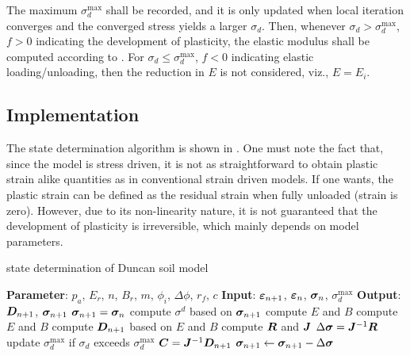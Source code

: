 The maximum $\sigma_d^\text{max}$ shall be recorded, and it is only updated when local iteration converges and the converged stress yields a larger $\sigma_d$.
Then, whenever $\sigma_d>\sigma_d^\text{max}$, $f>0$ indicating the development of plasticity, the elastic modulus shall be computed according to .
For $\sigma_d\leqslant\sigma_d^\text{max}$, $f<0$ indicating elastic loading/unloading, then the reduction in $E$ is not considered, viz., $E=E_i$.
\subsection{Implementation}
The state determination algorithm is shown in .
One must note the fact that, since the model is stress driven, it is not as straightforward to obtain plastic strain alike quantities as in conventional strain driven models.
If one wants, the plastic strain can be defined as the residual strain when fully unloaded (strain is zero).
However, due to its non-linearity nature, it is not guaranteed that the development of plasticity is irreversible, which mainly depends on model parameters.
\begin{breakablealgorithm}
\caption{state determination of Duncan soil model}\label{algo:duncan_model}
\begin{algorithmic}
\State \textbf{Parameter}: $p_a$, $E_r$, $n$, $B_r$, $m$, $\phi_i$, $\Delta\phi$, $r_f$, $c$
\State \textbf{Input}: $\bm{\varepsilon}_{n+1}$, $\bm{\varepsilon}_n$, $\bm{\sigma}_n$, $\sigma_d^{\text{max}}$
\State \textbf{Output}: $\bm{D}_{n+1}$, $\bm{\sigma}_{n+1}$
\State $\bm{\sigma}_{n+1}=\bm{\sigma}_n$
\State compute $\sigma^d$ based on $\bm{\sigma}_{n+1}$
\State compute $E$ and $B$
\Else
\State compute $E$ and $B$
\EndIf
\State compute $\bm{D}_{n+1}$ based on $E$ and $B$
\State compute $\bm{R}$ and $\bm{J}$
\State $\Delta\bm{\sigma}=\bm{J}^{-1}\bm{R}$
\State update $\sigma_d^{\text{max}}$ if $\sigma_d$ exceeds $\sigma_d^{\text{max}}$
\State $\bm{C}=\bm{J}^{-1}\bm{D}_{n+1}$
\State \Return
\EndIf
\State $\bm{\sigma}_{n+1}\leftarrow\bm{\sigma}_{n+1}-\Delta\bm{\sigma}$
\EndWhile
\end{algorithmic}
\end{breakablealgorithm}

